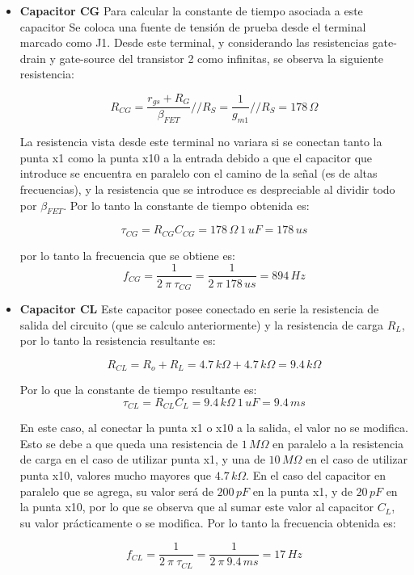 \documentclass[10pt,spanish,a4paper,notitlepage]{article}
\begin{document}
\begin{itemize}

\item \textbf{Capacitor CG}
Para calcular la constante de tiempo asociada a este capacitor Se coloca una fuente de tensión de prueba desde el terminal marcado como J1. Desde este terminal, y considerando las resistencias gate-drain y gate-source del transistor 2 como infinitas, se observa la siguiente resistencia:

\[ \displaystyle R_{CG} = \frac{r_{gs}+R_{G}}{\beta_{FET}}//R_{S}= \frac{1}{g_{m1}}//R_{S} = 178\,\unit{\Omega} \]

La resistencia vista desde este terminal no variara si se conectan tanto la punta x1 como la punta x10 a la entrada debido a que el capacitor que introduce se encuentra en paralelo con el camino de la señal (es de altas frecuencias), y la resistencia que se introduce es despreciable al dividir todo por $\beta_{FET}$. Por lo tanto la constante de tiempo obtenida es:

\[ \displaystyle \tau_{CG} = R_{CG} C_{CG} = 
178\,\unit{\Omega}\ 1\,\unit{uF} =
178\,\unit{us}\]

por lo tanto la frecuencia que se obtiene es:
\[ \displaystyle f_{CG} = \frac{1}{2\ \pi \ \tau_{CG}} =
\frac{1}{2\ \pi \ 178 \,\unit{us}} = 894\,\unit{Hz} \]

\item \textbf{Capacitor CL}
Este capacitor posee conectado en serie la resistencia de salida del circuito (que se calculo anteriormente) y la resistencia de carga $R_L$, por lo tanto la resistencia resultante es:

\[ \displaystyle R_{CL} =R_{o}+R_{L} =4.7\,\unit{k\Omega} + 4.7\,\unit{k\Omega} = 9.4\,\unit{k\Omega} \]

Por lo que la constante de tiempo resultante es:
\[ \displaystyle \tau_{CL} = R_{CL} C_{L} = 
9.4\,\unit{k\Omega}\ 1\,\unit{uF} =
9.4\,\unit{ms}\]

En este caso, al conectar la punta x1 o x10 a la salida, el valor no se modifica. Esto se debe a que queda una resistencia de $1\,\unit{M\Omega}$ en paralelo a la resistencia de carga en el caso de utilizar punta x1, y una de $10\,\unit{M\Omega}$ en el caso de utilizar punta x10, valores mucho mayores que $4.7\,\unit{k\Omega}$. En el caso del capacitor en paralelo que se agrega, su valor será de $200\,\unit{pF}$ en la punta x1, y de $20\,\unit{pF}$ en la punta x10, por lo que se observa que al sumar este valor al capacitor $C_L$, su valor prácticamente o se modifica. Por lo tanto la frecuencia obtenida es:

\[ \displaystyle f_{CL} = \frac{1}{2\ \pi \ \tau_{CL}} =
\frac{1}{2\ \pi \ 9.4 \,\unit{ms}} = 17\,\unit{Hz} \]

\end{itemize}
\end{document}
